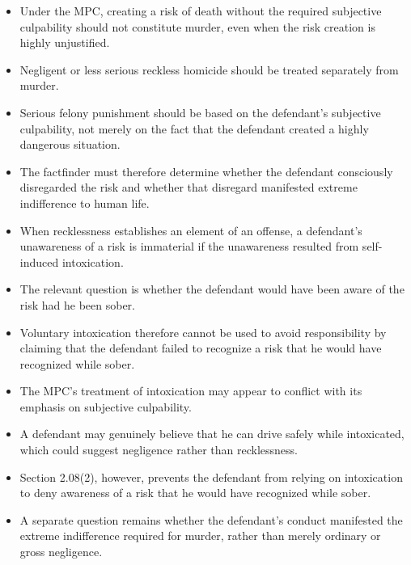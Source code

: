 \documentclass[11pt]{tex/lawoutline}
\begin{document}
{
\begin{itemize}
    \item Under the MPC, creating a risk of death without the required subjective culpability should not constitute murder, even when the risk creation is highly unjustified.
    \item Negligent or less serious reckless homicide should be treated separately from murder.
    \item Serious felony punishment should be based on the defendant's subjective culpability, not merely on the fact that the defendant created a highly dangerous situation.
    \item The factfinder must therefore determine whether the defendant consciously disregarded the risk and whether that disregard manifested extreme indifference to human life.
\end{itemize}
}

{
\begin{itemize}
    \item When recklessness establishes an element of an offense, a defendant's unawareness of a risk is immaterial if the unawareness resulted from self-induced intoxication.
    \item The relevant question is whether the defendant would have been aware of the risk had he been sober.
    \item Voluntary intoxication therefore cannot be used to avoid responsibility by claiming that the defendant failed to recognize a risk that he would have recognized while sober.
\end{itemize}
}

{
\begin{itemize}
    \item The MPC's treatment of intoxication may appear to conflict with its emphasis on subjective culpability.
    \item A defendant may genuinely believe that he can drive safely while intoxicated, which could suggest negligence rather than recklessness.
    \item Section 2.08(2), however, prevents the defendant from relying on intoxication to deny awareness of a risk that he would have recognized while sober.
    \item A separate question remains whether the defendant's conduct manifested the extreme indifference required for murder, rather than merely ordinary or gross negligence.
\end{itemize}
}
\end{document}
